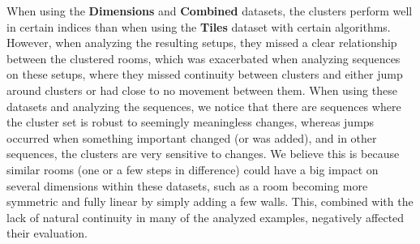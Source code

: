 



When using the \textbf{Dimensions} and \textbf{Combined} datasets, the clusters perform well in certain indices than when using the \textbf{Tiles} dataset with certain algorithms. However, when analyzing the resulting setups, they missed a clear relationship between the clustered rooms, which was exacerbated when analyzing sequences on these setups, where they missed continuity between clusters and either jump around clusters or had close to no movement between them. When using these datasets and analyzing the sequences, we notice that there are sequences where the cluster set is robust to seemingly meaningless changes, whereas jumps occurred when something important changed (or was added), and in other sequences, the clusters are very sensitive to changes. We believe this is because similar rooms (one or a few steps in difference) could have a big impact on several dimensions within these datasets, such as a room becoming more symmetric and fully linear by simply adding a few walls. This, combined with the lack of natural continuity in many of the analyzed examples, negatively affected their evaluation.



